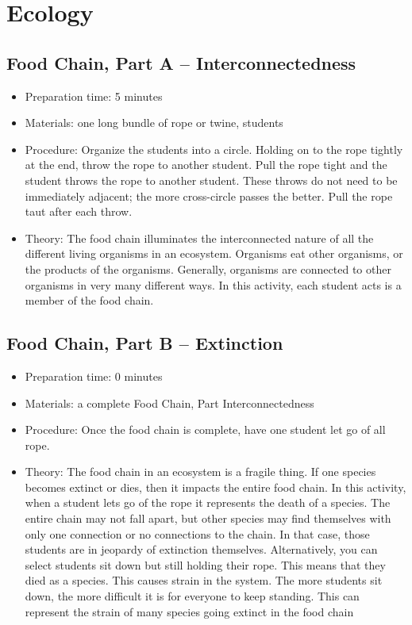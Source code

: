 \section{Ecology}
\subsection{Food Chain, Part A -- Interconnectedness}
\begin{itemize}
\item{Preparation time: 5 minutes}
\item{Materials: one long bundle of rope or twine, students}
\item{Procedure: Organize the students into a circle. Holding on to the rope tightly at the end, throw the rope to another student. Pull the rope tight and the student throws the rope to another student. These throws do not need to be immediately adjacent; the more cross-circle passes the better. Pull the rope taut after each throw.}
\item{Theory: The food chain illuminates the interconnected nature of all the different living organisms in an ecosystem. Organisms eat other organisms, or the products of the organisms. Generally, organisms are connected to other organisms in very many different ways. In this activity, each student acts is a member of the food chain.}
\end{itemize}

\subsection{Food Chain, Part B -- Extinction}
\begin{itemize}
\item{Preparation time: 0 minutes}
\item{Materials: a complete Food Chain, Part Interconnectedness}
\item{Procedure: Once the food chain is complete, have one student let go of all rope.}
\item{Theory: The food chain in an ecosystem is a fragile thing. If one species becomes extinct or dies, then it impacts the entire food chain. In this activity, when a student lets go of the rope it represents the death of a species. The entire chain may not fall apart, but other species may find themselves with only one connection or no connections to the chain. In that case, those students are in jeopardy of extinction themselves. Alternatively, you can select students sit down but still holding their rope. This means that they died as a species. This causes strain in the system. The more students sit down, the more difficult it is for everyone to keep standing. This can represent the strain of many species going extinct in the food chain}
\end{itemize}

